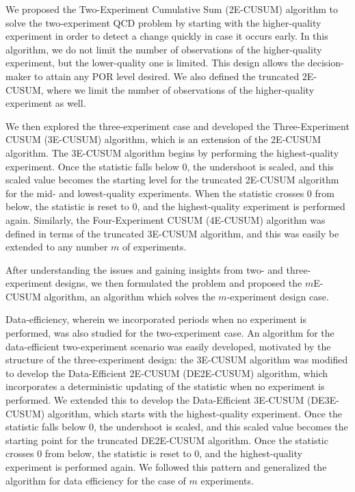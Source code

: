 \documentclass[journal, onecolumn]{IEEEtran}
\begin{document}
We proposed the Two-Experiment Cumulative Sum (2E-CUSUM) algorithm to solve the two-experiment QCD problem by starting with the higher-quality experiment in order to detect a change quickly in case it occurs early. In this algorithm, we do not limit the number of observations of the higher-quality experiment, but the lower-quality one is limited. This design allows the decision-maker to attain any POR level desired. We also defined the truncated 2E-CUSUM, where we limit the number of observations of the higher-quality experiment as well.

We then explored the three-experiment case and developed the Three-Experiment CUSUM (3E-CUSUM) algorithm, which is an extension of the 2E-CUSUM algorithm. The 3E-CUSUM algorithm begins by performing the highest-quality experiment. Once the statistic falls below 0, the undershoot is scaled, and this scaled value becomes the starting level for the truncated 2E-CUSUM algorithm for the mid- and lowest-quality experiments. When the statistic crosses 0 from below, the statistic is reset to 0, and the highest-quality experiment is performed again. Similarly, the Four-Experiment CUSUM (4E-CUSUM) algorithm was defined in terms of the truncated 3E-CUSUM algorithm, and this was easily be extended to any number $m$ of experiments.

After understanding the issues and gaining insights from two- and three-experiment designs, we then formulated the problem and proposed the $m$E-CUSUM algorithm, an algorithm which solves the $m$-experiment design case.

Data-efficiency, wherein we incorporated periods when no experiment is performed, was also studied for the two-experiment case. An algorithm for the data-efficient two-experiment scenario was easily developed, motivated by the structure of the three-experiment design: the 3E-CUSUM algorithm was modified to develop the Data-Efficient 2E-CUSUM (DE2E-CUSUM) algorithm, which incorporates a deterministic updating of the statistic when no experiment is performed. We extended this to develop the Data-Efficient 3E-CUSUM (DE3E-CUSUM) algorithm, which starts with the highest-quality experiment. Once the statistic falls below 0, the undershoot is scaled, and this scaled value becomes the starting point for the truncated DE2E-CUSUM algorithm. Once the statistic crosses 0 from below, the statistic is reset to 0, and the highest-quality experiment is performed again. We followed this pattern and generalized the algorithm for data efficiency for the case of $m$ experiments.
\end{document}
